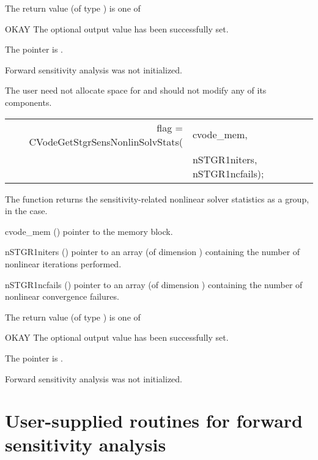 {
  The return value  (of type ) is one of
  \begin{args}
  \item[OKAY] 
    The optional output value has been successfully set.
  \item[\Id{CVG\_NO\_MEM}]
    The  pointer is .
  \item[\Id{CVG\_NO\_SENS}]
    Forward sensitivity analysis was not initialized.
  \end{args}
}
{
  The user need not allocate space for  and should not modify
  any of its components.
}
{
  \begin{tabular}[t]{@{}r@{}l@{}}
    flag = CVodeGetStgrSensNonlinSolvStats(&cvode\_mem, \\
                                           &nSTGR1niters, nSTGR1ncfails);
  \end{tabular}
}
{
  The function  returns the sensitivity-related
  nonlinear solver statistics as a group, in the  case.
}
{
  \begin{args}
  \item[cvode\_mem] ()
    pointer to the {\cvodes} memory block.
  \item[nSTGR1niters] ()
    pointer to an array (of dimension ) containing the number of 
    nonlinear iterations performed.
  \item[nSTGR1ncfails] ()
    pointer to an array (of dimension ) containing the 
    number of nonlinear convergence failures.
  \end{args}
}
{
  The return value  (of type ) is one of
  \begin{args}
  \item[OKAY] 
    The optional output value has been successfully set.
  \item[\Id{CVG\_NO\_MEM}]
    The  pointer is .
  \item[\Id{CVG\_NO\_SENS}]
    Forward sensitivity analysis was not initialized.
  \end{args}
}
{}
\section{User-supplied routines for forward sensitivity analysis}
\label{s:user_fct_fwd}

